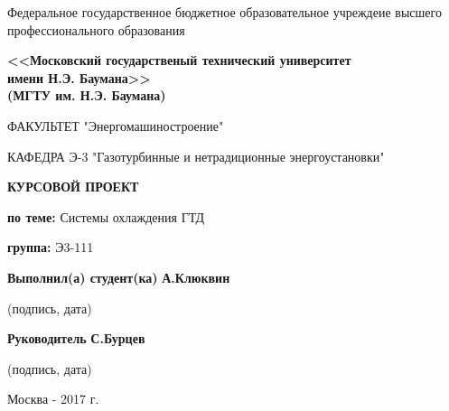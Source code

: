 \begin{titlepage}
	\begin{center}
	    { Федеральное государственное бюджетное образовательное учреждеие высшего профессионального образования \\}
	\end{center}


   \begin{minipage}{0.80\textwidth}
		\begin{large}
			\begin{center}
				{
		\textbf{<<Московский государственый технический университет \\ имени Н.Э. Баумана>> \\ (МГТУ им. Н.Э. Баумана) \\}
   				}
			\end{center}
   		\end{large}
	\end{minipage}

   \begin{center}
    \vspace{0.25cm}
	\noindent\makebox[\linewidth]{\rule{\textwidth}{0.4pt}}

    ФАКУЛЬТЕТ "Энергомашиностроение"

    КАФЕДРА Э-3 "Газотурбинные и нетрадиционные энергоустановки"
    \vspace{1cm}


    \begin{large}\textbf{КУРСОВОЙ ПРОЕКТ}\end{large}

	\end{center}
    \textbf{по теме:} Системы охлаждения ГТД

    \textbf{группа:} Э3-111

    \begin{small}\textbf{Выполнил(а) студент(ка)} \makebox[9cm]{\hrulefill}  \textbf{А.Клюквин} \\
    \centerline{(подпись, дата)}
    \end{small}

    \begin{small}\textbf{Руководитель} \makebox[11.8cm]{\hrulefill}   \textbf{С.Бурцев} \\
    \centerline{(подпись, дата)}
    \end{small}



\vfill

\begin{center}
  Москва - 2017 г.
\end{center}
\end{titlepage}